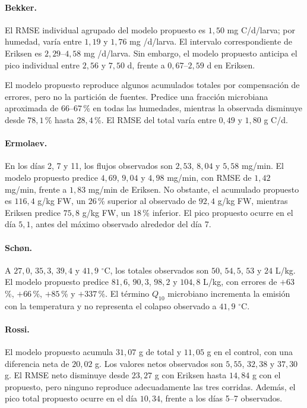 \paragraph{Bekker.}
El RMSE individual agrupado del modelo propuesto es
$1{,}50$ mg C/d/larva; por humedad, varía entre $1{,}19$ y
$1{,}76$ mg \co{}/d/larva. El intervalo correspondiente de Eriksen es
$2{,}29$--$4{,}58$ mg \co{}/d/larva. Sin embargo, el modelo propuesto
anticipa el pico individual entre $2{,}56$ y $7{,}50$ d, frente a
$0{,}67$--$2{,}59$ d en Eriksen.

El modelo propuesto reproduce algunos acumulados totales por
compensación de errores, pero no la partición de fuentes. Predice una
fracción microbiana aproximada de $66$--$67$\,\% en todas las humedades,
mientras la observada disminuye desde $78{,}1$\,\% hasta
$28{,}4$\,\%. El RMSE del total varía entre $0{,}49$ y
$1{,}80$ g C/d.

\paragraph{Ermolaev.}
En los días 2, 7 y 11, los flujos observados son $2{,}53$, $8{,}04$ y
$5{,}58$ mg/min. El modelo propuesto predice $4{,}69$, $9{,}04$ y
$4{,}98$ mg/min, con RMSE de $1{,}42$ mg/min, frente a
$1{,}83$ mg/min de Eriksen. No obstante, el acumulado propuesto es
$116{,}4$ g/kg FW, un $26$\,\% superior al observado de
$92{,}4$ g/kg FW, mientras Eriksen predice $75{,}8$ g/kg FW, un
$18$\,\% inferior. El pico propuesto ocurre en el día $5{,}1$, antes
del máximo observado alrededor del día 7.

\paragraph{Schøn.}
A $27{,}0$, $35{,}3$, $39{,}4$ y $41{,}9$ $^\circ$C, los totales
observados son $50$, $54{,}5$, $53$ y $24$ L/kg. El modelo propuesto
predice $81{,}6$, $90{,}3$, $98{,}2$ y $104{,}8$ L/kg, con errores de
$+63$\,\%, $+66$\,\%, $+85$\,\% y $+337$\,\%. El término $Q_{10}$
microbiano incrementa la emisión con la temperatura y no representa el
colapso observado a $41{,}9$ $^\circ$C.

\paragraph{Rossi.}
El modelo propuesto acumula $31{,}07$ g de \co{} total y
$11{,}05$ g en el control, con una diferencia neta de $20{,}02$ g.
Los valores netos observados son $5{,}55$, $32{,}38$ y $37{,}30$ g.
El RMSE neto disminuye desde $23{,}27$ g con Eriksen hasta
$14{,}84$ g con el propuesto, pero ninguno reproduce adecuadamente las
tres corridas. Además, el pico total propuesto ocurre en el día
$10{,}34$, frente a los días 5--7 observados.

